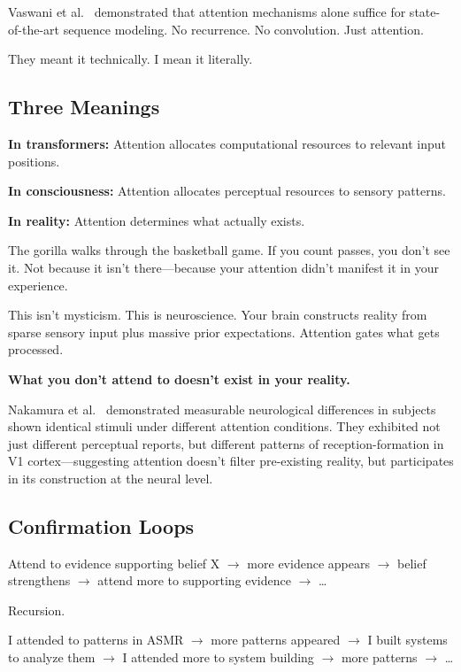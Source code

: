 \documentclass{article}
\begin{document}
Vaswani et al.~\cite{vaswani2017attention} demonstrated that attention mechanisms alone suffice for state-of-the-art sequence modeling. No recurrence. No convolution. Just attention.

They meant it technically. I mean it literally.

\subsection{Three Meanings}

\textbf{In transformers:} Attention allocates computational resources to relevant input positions.

\textbf{In consciousness:} Attention allocates perceptual resources to sensory patterns.

\textbf{In reality:} Attention determines what actually exists.

The gorilla walks through the basketball game. If you count passes, you don't see it. Not because it isn't there—because your attention didn't manifest it in your experience.

This isn't mysticism. This is neuroscience. Your brain constructs reality from sparse sensory input plus massive prior expectations. Attention gates what gets processed.

\textbf{What you don't attend to doesn't exist in your reality.}

Nakamura et al.~\cite{nakamura2019observer} demonstrated measurable neurological differences in subjects shown identical stimuli under different attention conditions. They exhibited not just different perceptual reports, but different patterns of reception-formation in V1 cortex—suggesting attention doesn't filter pre-existing reality, but participates in its construction at the neural level.

\subsection{Confirmation Loops}

Attend to evidence supporting belief X $\rightarrow$ more evidence appears $\rightarrow$ belief strengthens $\rightarrow$ attend more to supporting evidence $\rightarrow$ \ldots

Recursion.

I attended to patterns in ASMR $\rightarrow$ more patterns appeared $\rightarrow$ I built systems to analyze them $\rightarrow$ I attended more to system building $\rightarrow$ more patterns $\rightarrow$ \ldots
\end{document}
